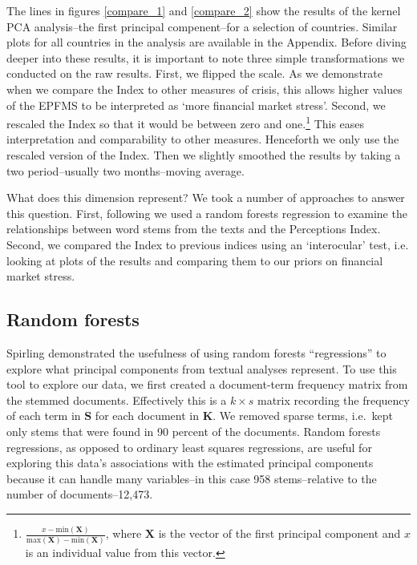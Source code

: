 \documentclass[]{article}
\begin{document}
The lines in figures \ref{compare_1} and \ref{compare_2} show the
results of the kernel PCA analysis--the first principal compenent--for a selection of countries. Similar plots for
all countries in the analysis are available in the Appendix. Before
diving deeper into these results, it is important to note three simple
transformations we conducted on the raw results. First, we flipped the
scale. As we demonstrate when we compare the Index to other measures of
crisis, this allows higher values of the EPFMS to be interpreted as
`more financial market stress'. Second, we rescaled the Index so that it
would be between zero and one.\footnote{\(\frac{x - \mathrm{min}(\bm{X})}{\mathrm{max}(\bm{X}) - \mathrm{min}(\bm{X})}\),
  where \(\bm{X}\) is the vector of the first principal component and
  \(x\) is an individual value from this vector.} This eases
interpretation and comparability to other measures. Henceforth we only
use the rescaled version of the Index. Then we slightly smoothed the
results by taking a two period--usually two months--moving average.

What does this dimension represent? We took a number of approaches to
answer this question. First, following \cite{Spirling2012} we used a random
forests regression \citep{Breiman2001,jones2015} to examine the
relationships between word stems from the texts and the Perceptions
Index. Second, we compared the Index to previous indices using an
`interocular' test, i.e. looking at plots of the results and comparing
them to our priors on financial market stress.

\subsection{Random forests}\label{random-forests}

Spirling \citeyearpar[6--8]{Spirling2012} demonstrated the usefulness of using random forests
``regressions'' to explore what principal components from textual
analyses represent. To use this tool to explore our data, we first created a document-term
frequency matrix from the stemmed documents. Effectively this is a
\(k \times s\) matrix recording the frequency of each term in \(\bm{S}\)
for each document in \(\bm{K}\). We removed sparse terms, i.e.~kept only
stems that were found in 90 percent of the documents. Random forests
regressions, as opposed to ordinary least squares regressions, are useful
for exploring this data's associations with the estimated principal components because it can handle many variables--in this case 958 stems--relative to the number of documents--12,473.
\end{document}
